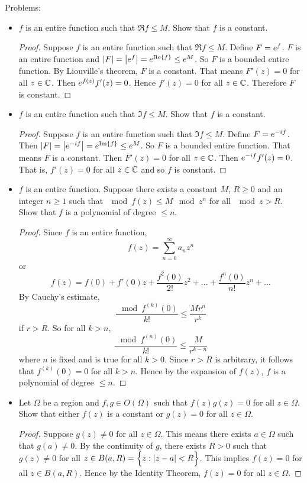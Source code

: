 \documentclass[12pt]{article}
\begin{document}
Problems: \begin{itemize} 
\item $f$ is an entire function such that $\Re{f} \leq M$. Show that $f$ is a constant.
\begin{proof} Suppose $f$ is an entire function such that $\Re{f} \leq M$. Define $F = e^{f}$. $F$ is an entire function and $\abs{F} = \abs{e^{f}} = e^{\Re{f}} \leq e^{M}$. So $F$ is a bounded entire function. By Liouville's theorem, $F$ is a constant. That means $F'(z) = 0$ for all $z \in \mathbb{C}$. Then $e^{f(z)}f'(z) = 0$. Hence $f'(z) = 0$ for all $z \in \mathbb{C}$. Therefore $F$ is constant. \end{proof}  
\item $f$ is an entire function such that $\Im{f} \leq M$. Show that $f$ is a constant. 
\begin{proof} Suppose $f$ is an entire function such that $\Im{f} \leq M$. Define $F = e^{-if}$. Then $\abs{F} = \abs{e^{-if}} = e^{\Im{f}} \leq e^{M}$. So $F$ is a bounded entire function. That means $F$ is a constant. Then $F'(z) = 0$ for all $z \in \mathbb{C}$. Then $e^{-if}f'(z) = 0$. That is, $f'(z) = 0$ for all $z \in \mathbb{C}$ and so $f$ is constant. \end{proof} 
\item $f$ is an entire function. Suppose there exists a constant $M$, $R \geq 0$ and an integer $n \geq 1$ such that $\mod{f(z)} \leq M\mod{z}^n$ for all $\mod{z} > R$. Show that $f$ is a polynomial of degree $\leq n$. 
\begin{proof} Since $f$ is an entire function, $$f(z) = \sum_{n=0}^\infty a_nz^n$$ or $$ f(z) = f(0) + f'(0)z + \frac{f^2(0)}{2!}z^2 + \dots + \frac{f^n(0)}{n!}z^n + \dots $$ 
By Cauchy's estimate, $$ \frac{\mod{f^{(k)}(0)}}{k!} \leq \frac{Mr^n}{r^k} $$ if $r > R$. So for all $ k > n$, $$ \frac{\mod{f^{(n)}(0)}}{k!} \leq \frac{M}{r^{k-n}} $$ where $n$ is fixed and is true for all $k > 0$. Since $r > R$ is arbitrary, it follows that $f^{(k)}(0) = 0$ for all $k>n$. Hence by the expansion of $f(z)$, $f$ is a polynomial of degree $\leq n$. \end{proof}
\item Let $\Omega$ be a region and $f, g \in O(\Omega)$ such that $f(z)g(z) = 0$ for all $z \in \Omega$. Show that either $f(z)$ is a constant or $g(z) = 0$ for all $z \in \Omega$. 
\begin{proof} 
Suppose $g(z) \neq 0$ for all $z \in \Omega$. This means there exists $a \in \Omega$ such that $g(a) \neq 0$. By the continuity of $g$, there exists $R > 0$ such that $g(z) \neq 0$ for all $z \in B(a,R) = \Big\{ z: \abs{z-a} < R \Big\}$. This implies $f(z) = 0$ for all $z \in B(a,R)$. Hence by the Identity Theorem, $f(z) = 0$ for all $z \in \Omega$. 

\end{proof}
\end{itemize}
\end{document}
